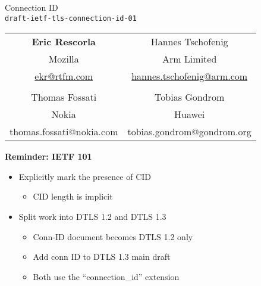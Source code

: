 \documentclass[helvetica]{seminar}
\newcommand{\heading}[1]{%
  \begin{center} 
    \large\bf 
    #1 
  \end{center} 
  \vspace{.4 in}}
\begin{document}
\begin{slide}
\begin{center}
\vspace{.5 in}
\LARGE{{\bf}Connection ID\\{\small \verb^draft-ietf-tls-connection-id-01^}}\\
\vspace{.2in}
{\small
\begin{tabular}{c c}
\textbf{Eric Rescorla} & Hannes Tschofenig \\
Mozilla& Arm Limited \\ 
  \url{ekr@rtfm.com} & \url{hannes.tschofenig@arm.com} \\
  \\
  Thomas Fossati & Tobias Gondrom \\
  Nokia & Huawei \\
  thomas.fossati@nokia.com & tobias.gondrom@gondrom.org \\
  \end{tabular}

}

\end{center}
\end{slide}

\centerslidesfalse 

\begin{slide}
  \heading{Reminder: IETF 101}

  \begin{itemize}
  \item Explicitly mark the presence of CID
    \begin{itemize}
    \item CID length is implicit
    \end{itemize}
  \item Split work into DTLS 1.2 and DTLS 1.3
    \begin{itemize}
    \item Conn-ID document becomes DTLS 1.2 only
    \item Add conn ID to DTLS 1.3 main draft
    \item Both use the ``connection\_id'' extension
    \end{itemize}
  \end{itemize}
\end{slide}
\end{document}
